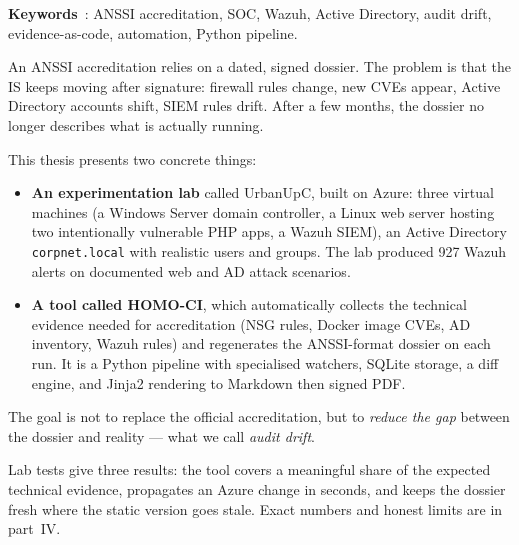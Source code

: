 \textbf{Keywords}~: ANSSI accreditation, SOC, Wazuh, Active
Directory, audit drift, evidence-as-code, automation, Python
pipeline.

\bigskip

An ANSSI accreditation relies on a dated, signed dossier. The
problem is that the IS keeps moving after signature: firewall
rules change, new CVEs appear, Active Directory accounts shift,
SIEM rules drift. After a few months, the dossier no longer
describes what is actually running.

This thesis presents two concrete things:

\begin{itemize}
\item \textbf{An experimentation lab} called UrbanUpC, built on
  Azure: three virtual machines (a Windows Server domain
  controller, a Linux web server hosting two intentionally
  vulnerable PHP apps, a Wazuh SIEM), an Active Directory
  \texttt{corpnet.local} with realistic users and groups. The lab
  produced 927 Wazuh alerts on documented web and AD attack
  scenarios.

\item \textbf{A tool called HOMO-CI}, which automatically collects
  the technical evidence needed for accreditation (NSG rules,
  Docker image CVEs, AD inventory, Wazuh rules) and regenerates
  the ANSSI-format dossier on each run. It is a Python pipeline
  with specialised watchers, SQLite storage, a diff engine, and
  Jinja2 rendering to Markdown then signed PDF.
\end{itemize}

The goal is not to replace the official accreditation, but to
\emph{reduce the gap} between the dossier and reality --- what we
call \emph{audit drift}.

Lab tests give three results: the tool covers a meaningful share
of the expected technical evidence, propagates an Azure change in
seconds, and keeps the dossier fresh where the static version
goes stale. Exact numbers and honest limits are in part~IV.
